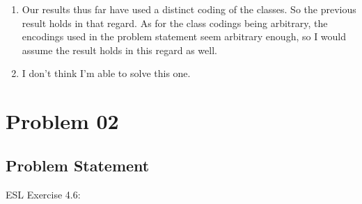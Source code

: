 \documentclass{article}
\begin{document}
\begin{enumerate}
  \item Our results thus far have used a distinct coding of the classes. So the previous result holds in that regard. As for the class codings being arbitrary, the encodings used in the problem statement seem arbitrary enough, so I would assume the result holds in this regard as well.  

  \item I don't think I'm able to solve this one.
\end{enumerate}

\newpage
\section{Problem 02}
\subsection{Problem Statement}
ESL Exercise 4.6:
\end{document}
